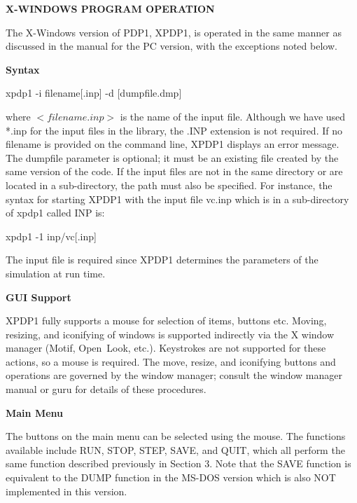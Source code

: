 \newpage
\begin{section}		%
{\bf X-WINDOWS PROGRAM OPERATION}

The X-Windows version of PDP1, XPDP1, is operated in the same manner as
discussed in the manual for the PC version, with the exceptions noted below.

\begin{subsection}
{\bf Syntax}

   xpdp1 -i filename[.inp] -d [dumpfile.dmp]
 \vspace{.2in}

\noindent
   where $<filename.inp>$ is the name of the input file.  Although we have used
   *.inp for the input files in the library, the .INP extension is not
   required.  If no filename is provided on the command line, XPDP1 displays an
   error message.  The dumpfile parameter is optional; it must be an existing
   file created by the same version of the code.  If the input files are not in
   the same directory or are located in a sub-directory, the path must also be
   specified.  For instance, the syntax for starting XPDP1 with the input file
   vc.inp which is in a sub-directory of xpdp1 called INP is:
\vspace{.2in}

\noindent
   xpdp1 -1 inp/vc[.inp]
\vspace{.2in}

\noindent
   The input file is required since XPDP1 determines the parameters of the
   simulation at run time.
\end{subsection}

\begin{subsection}
{\bf GUI Support}

   XPDP1 fully supports a mouse for selection of items, buttons etc.  Moving,
   resizing, and iconifying of windows is supported indirectly via the X window
   manager (Motif, Open~Look, etc.).  Keystrokes are not supported for these
   actions, so a mouse is required.  The move, resize, and iconifying buttons
   and operations are governed by the window manager; consult the window
   manager manual or guru for details of these procedures.
\end{subsection}

\begin{subsection}
{\bf Main Menu}

   The buttons on the main menu can be selected using the mouse.  The functions
   available include RUN, STOP, STEP, SAVE, and QUIT, which all perform the
   same function described previously in Section 3.  Note that the SAVE
   function is equivalent to the DUMP function in the MS-DOS version which is
   also NOT implemented in this version.
\end{subsection}


\end{section}

